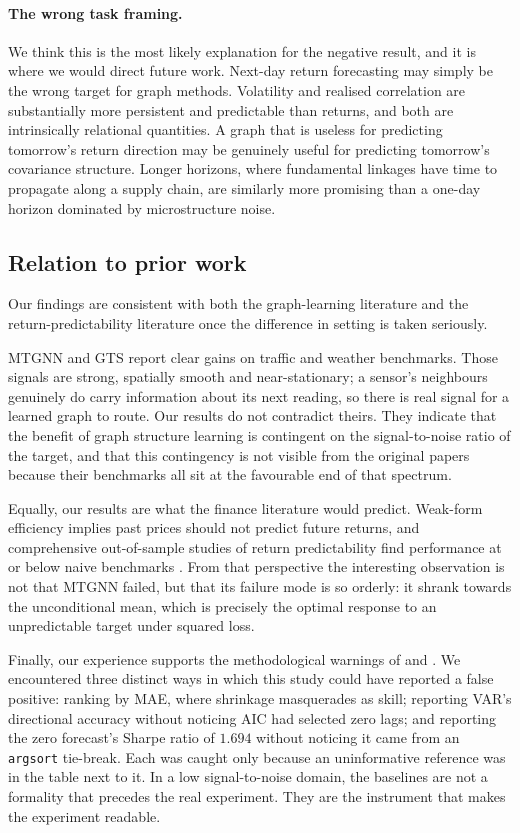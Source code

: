 \paragraph{The wrong task framing.} We think this is the most likely explanation for the negative result, and it is where we would direct future work. Next-day return forecasting may simply be the wrong target for graph methods. Volatility and realised correlation are substantially more persistent and predictable than returns, and both are intrinsically relational quantities. A graph that is useless for predicting tomorrow's return direction may be genuinely useful for predicting tomorrow's covariance structure. Longer horizons, where fundamental linkages have time to propagate along a supply chain, are similarly more promising than a one-day horizon dominated by microstructure noise.

\subsection{Relation to prior work}

Our findings are consistent with both the graph-learning literature and the return-predictability literature once the difference in setting is taken seriously.

MTGNN \parencite{wu2020mtgnn} and GTS \parencite{shang2021gts} report clear gains on traffic and weather benchmarks. Those signals are strong, spatially smooth and near-stationary; a sensor's neighbours genuinely do carry information about its next reading, so there is real signal for a learned graph to route. Our results do not contradict theirs. They indicate that the benefit of graph structure learning is contingent on the signal-to-noise ratio of the target, and that this contingency is not visible from the original papers because their benchmarks all sit at the favourable end of that spectrum.

Equally, our results are what the finance literature would predict. Weak-form efficiency \parencite{fama1970efficient} implies past prices should not predict future returns, and comprehensive out-of-sample studies of return predictability find performance at or below naive benchmarks \parencite{welch2008comprehensive}. From that perspective the interesting observation is not that MTGNN failed, but that its failure mode is so orderly: it shrank towards the unconditional mean, which is precisely the optimal response to an unpredictable target under squared loss.

Finally, our experience supports the methodological warnings of \textcite{harvey2016cross} and \textcite{lopezdeprado2014backtest}. We encountered three distinct ways in which this study could have reported a false positive: ranking by MAE, where shrinkage masquerades as skill; reporting VAR's directional accuracy without noticing AIC had selected zero lags; and reporting the zero forecast's Sharpe ratio of $1.694$ without noticing it came from an \texttt{argsort} tie-break. Each was caught only because an uninformative reference was in the table next to it. In a low signal-to-noise domain, the baselines are not a formality that precedes the real experiment. They are the instrument that makes the experiment readable.
